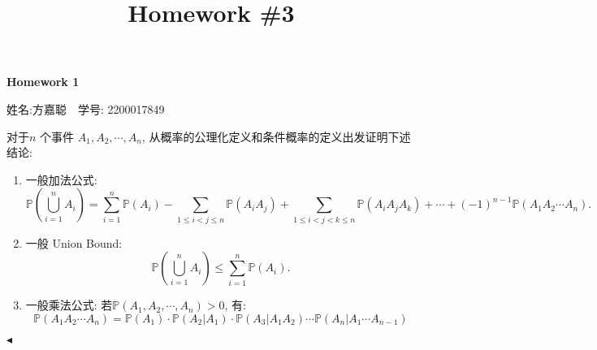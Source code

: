 \documentclass[11pt]{article}
\title{Homework \#3}
\newenvironment{problem}[2][Problem]{\begin{trivlist}
\item[\hskip \labelsep {\bfseries #1}\hskip \labelsep {\bfseries #2.}]\songti}{\hfill$\blacktriangleleft$\end{trivlist}}
\newcommand\1{\mathds{1}}
\newcommand\PP{\mathbb{P}}
\begin{document}
\kaishu

\pagestyle{fancy}
\chead{}



\begin{center}
    {\LARGE \bf Homework 1}

    {姓名:方嘉聪\ \  学号: 2200017849}            %
\end{center}

\begin{problem}{1}
    \songti
    对于$n$ 个事件 $A_1, A_2, \cdots, A_n$, 从概率的公理化定义和条件概率的定义出发证明下述结论: 
    \begin{enumerate}[label=(\arabic*)]
        \item 一般加法公式:\[\PP\left(\bigcup_{i=1}^n A_i\right) = \sum_{i=1}^{n}\PP(A_i) - \sum_{1\le i < j \le n}\PP(A_i A_j) + \sum_{1\le i < j < k \le n}\PP(A_i A_j A_k) + \cdots + (-1)^{n-1} \PP(A_1A_2\cdots A_n).\] 
        \item 一般 Union Bound: \[\PP\left(\bigcup_{i=1}^n A_i\right) \le \sum_{i=1}^{n} \PP(A_i).\]
        \item 一般乘法公式: 若$\PP(A_1, A_2, \cdots, A_n) > 0$, 有: \[\PP(A_1 A_2 \cdots A_n ) = \PP(A_1)\cdot\PP(A_2|A_1)\cdot \PP(A_3|A_1 A_2) \cdots \PP(A_n|A_1\cdots A_{n-1})\]
    \end{enumerate}
\end{problem}
\end{document}
